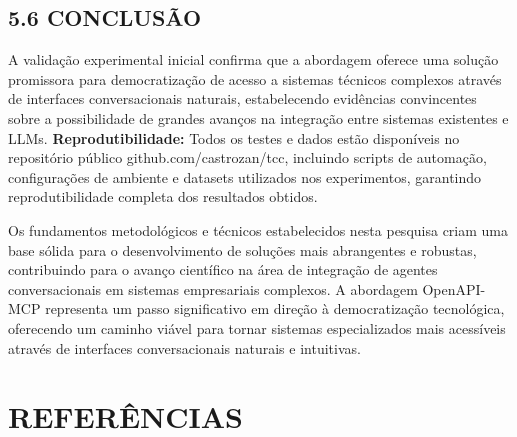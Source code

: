\documentclass[
]{article}
\begin{document}
\subsection{5.6 CONCLUSÃO}\label{conclusuxe3o}

A validação experimental inicial confirma que a abordagem oferece uma
solução promissora para democratização de acesso a sistemas técnicos
complexos através de interfaces conversacionais naturais, estabelecendo
evidências convincentes sobre a possibilidade de grandes avanços na
integração entre sistemas existentes e LLMs. \textbf{Reprodutibilidade:}
Todos os testes e dados estão disponíveis no repositório público
github.com/castrozan/tcc, incluindo scripts de automação, configurações
de ambiente e datasets utilizados nos experimentos, garantindo
reprodutibilidade completa dos resultados obtidos.

Os fundamentos metodológicos e técnicos estabelecidos nesta pesquisa
criam uma base sólida para o desenvolvimento de soluções mais
abrangentes e robustas, contribuindo para o avanço científico na área de
integração de agentes conversacionais em sistemas empresariais
complexos. A abordagem OpenAPI-MCP representa um passo significativo em
direção à democratização tecnológica, oferecendo um caminho viável para
tornar sistemas especializados mais acessíveis através de interfaces
conversacionais naturais e intuitivas.

\section*{REFERÊNCIAS}\label{referuxeancias}
\end{document}
